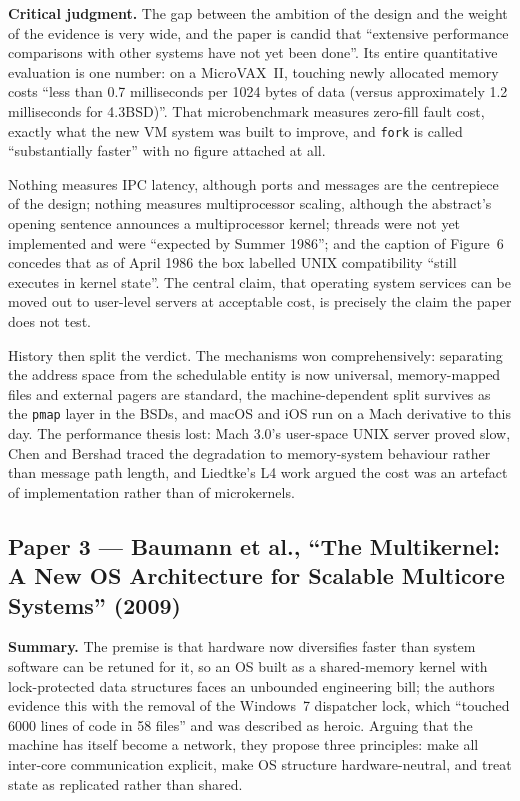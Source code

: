 \textbf{Critical judgment.} The gap between the ambition of the design and the weight of
the evidence is very wide, and the paper is candid that ``extensive performance comparisons
with other systems have not yet been done''. Its entire quantitative evaluation is one
number: on a MicroVAX~II, touching newly allocated memory costs ``less than 0.7
milliseconds per 1024 bytes of data (versus approximately 1.2 milliseconds for 4.3BSD)''.
That microbenchmark measures zero-fill fault cost, exactly what the new VM system was built
to improve, and \texttt{fork} is called ``substantially faster'' with no figure attached at
all.

Nothing measures IPC latency, although ports and messages are the centrepiece of the
design; nothing measures multiprocessor scaling, although the abstract's opening sentence
announces a multiprocessor kernel; threads were not yet implemented and were ``expected by
Summer 1986''; and the caption of Figure~6 concedes that as of April 1986 the box labelled
UNIX compatibility ``still executes in kernel state''. The central claim, that operating
system services can be moved out to user-level servers at acceptable cost, is precisely the
claim the paper does not test.

History then split the verdict. The mechanisms won comprehensively: separating the address
space from the schedulable entity is now universal, memory-mapped files and external pagers
are standard, the machine-dependent split survives as the \texttt{pmap} layer in the BSDs,
and macOS and iOS run on a Mach derivative to this day. The performance thesis lost: Mach
3.0's user-space UNIX server proved slow, Chen and Bershad traced the degradation to
memory-system behaviour rather than message path length, and Liedtke's L4 work argued the
cost was an artefact of implementation rather than of microkernels.

\subsection*{Paper 3 --- Baumann et al., ``The Multikernel: A New OS Architecture for Scalable Multicore Systems'' (2009)}
\label{p4:sec:multikernel}

\textbf{Summary.} The premise is that hardware now diversifies faster than system software
can be retuned for it, so an OS built as a shared-memory kernel with lock-protected data
structures faces an unbounded engineering bill; the authors evidence this with the removal
of the Windows~7 dispatcher lock, which ``touched 6000 lines of code in 58 files'' and was
described as heroic. Arguing that the machine has itself become a network, they propose
three principles: make all inter-core communication explicit, make OS structure
hardware-neutral, and treat state as replicated rather than shared.

